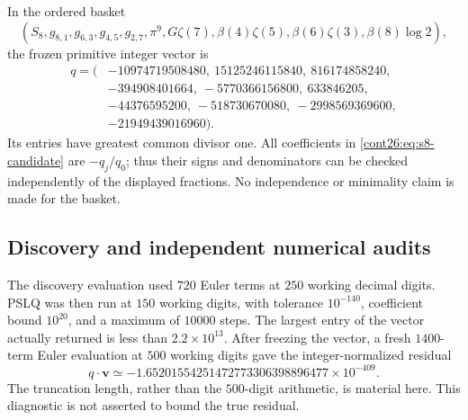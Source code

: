 \documentclass[11pt,letterpaper]{article}
\numberwithin{equation}{section}
\theoremstyle{plain}
\theoremstyle{definition}
\theoremstyle{remark}
\begin{document}
In the ordered basket
\begin{equation}\label{cont26:eq:s8-basket}
 (S_8,g_{8,1},g_{6,3},g_{4,5},g_{2,7},\pi^9,
       G\zeta(7),\beta(4)\zeta(5),\beta(6)\zeta(3),\beta(8)\log2),
\end{equation}
the frozen primitive integer vector is
\begin{equation}\label{cont26:eq:s8-vector}
\begin{split}
q=(&-10974719508480,\ 15125246115840,\ 816174858240,\\
   &-394908401664,\ -5770366156800,\ 633846205,\\
   &-44376595200,\ -518730670080,\ -2998569369600,\\
   &-21949439016960).
\end{split}
\end{equation}
Its entries have greatest common divisor one. All coefficients in
\eqref{cont26:eq:s8-candidate} are $-q_j/q_0$; thus their signs and
denominators can be checked independently of the displayed fractions.
No independence or minimality claim is made for the basket.

\subsection{Discovery and independent numerical audits}
The discovery evaluation used $720$ Euler terms at $250$ working decimal
digits. PSLQ was then run at $150$ working digits, with tolerance
$10^{-140}$, coefficient bound $10^{20}$, and a maximum of $10000$
steps. The largest entry of the vector actually returned is less than
$2.2\times10^{13}$. After freezing the vector, a fresh $1400$-term
Euler evaluation at $500$ working digits gave the integer-normalized
residual
\begin{equation}\label{cont26:eq:s8-euler-residual}
 q\cdot\mathbf v\simeq
 -1.65201554251472773306398896477\times10^{-409}.
\end{equation}
The truncation length, rather than the $500$-digit arithmetic, is material
here. This diagnostic is not asserted to bound the true residual.
\end{document}
